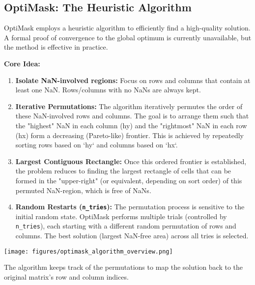 \documentclass[a0,landscape]{a0poster}
\begin{document}
\begin{multicols}{4}
	\section*{OptiMask: The Heuristic Algorithm}
	OptiMask employs a heuristic algorithm to efficiently find a high-quality solution. A formal proof of convergence to the global optimum is currently unavailable, but the method is effective in practice.

	\textbf{Core Idea:}
	\begin{enumerate}
		\item \textbf{Isolate NaN-involved regions:} Focus on rows and columns that contain at least one NaN. Rows/columns with no NaNs are always kept.
		\item \textbf{Iterative Permutations:} The algorithm iteratively permutes the order of these NaN-involved rows and columns. The goal is to arrange them such that the "highest" NaN in each column (hy) and the "rightmost" NaN in each row (hx) form a decreasing (Pareto-like) frontier. This is achieved by repeatedly sorting rows based on `hy` and columns based on `hx`.
		\item \textbf{Largest Contiguous Rectangle:} Once this ordered frontier is established, the problem reduces to finding the largest rectangle of cells that can be formed in the "upper-right" (or equivalent, depending on sort order) of this permuted NaN-region, which is free of NaNs.
		\item \textbf{Random Restarts (\texttt{n\_tries}):} The permutation process is sensitive to the initial random state. OptiMask performs multiple trials (controlled by \texttt{n\_tries}), each starting with a different random permutation of rows and columns. The best solution (largest NaN-free area) across all tries is selected.
	\end{enumerate}

	\begin{center}\vspace{0.5cm}
		\texttt{[image: figures/optimask\_algorithm\_overview.png]} %
		\label{fig:optimask_algorithm}
	\end{center}\vspace{0.5cm}

	The algorithm keeps track of the permutations to map the solution back to the original matrix's row and column indices.


\end{multicols}
\end{document}
